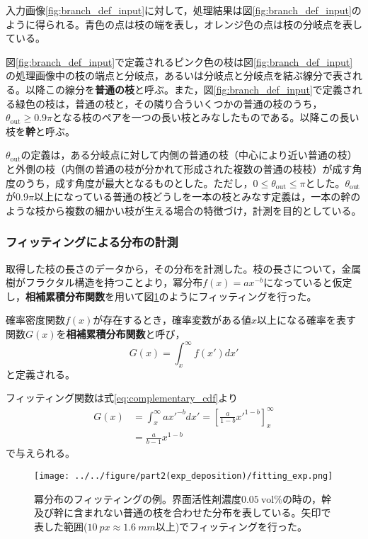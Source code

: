 \documentclass[autodetect-engine,dvi=dvipdfmx,a4paper,ja=standard,oneside,openany,11pt]{bxjsbook}
\begin{document}
入力画像\ref{fig:branch_def_input}に対して，処理結果は図\ref{fig:branch_def_input}のように得られる。青色の点は枝の端を表し，オレンジ色の点は枝の分岐点を表している。

図\ref{fig:branch_def_input}で定義されるピンク色の枝は図\ref{fig:branch_def_input}の処理画像中の枝の端点と分岐点，あるいは分岐点と分岐点を結ぶ線分で表される。以降この線分を\textbf{普通の枝}と呼ぶ。また，図\ref{fig:branch_def_input}で定義される緑色の枝は，普通の枝と，その隣り合ういくつかの普通の枝のうち，$\theta_{\mathrm{out}}\geq 0.9\pi$となる枝のペアを一つの長い枝とみなしたものである。以降この長い枝を\textbf{幹}と呼ぶ。

$\theta_{\mathrm{out}}$の定義は，ある分岐点に対して内側の普通の枝（中心により近い普通の枝）と外側の枝（内側の普通の枝が分かれて形成された複数の普通の枝枝）が成す角度のうち，成す角度が最大となるものとした。ただし，$0\leq\theta_{\mathrm{out}}\leq\pi$とした。$\theta_{\mathrm{out}}$が$0.9\pi$以上になっている普通の枝どうしを一本の枝とみなす定義は，一本の幹のような枝から複数の細かい枝が生える場合の特徴づけ，計測を目的としている。

\subsubsection{フィッティングによる分布の計測}
取得した枝の長さのデータから，その分布を計測した。枝の長さについて，金属樹がフラクタル構造を持つことより，冪分布$f(x)=ax^{-b}$になっていると仮定し，\textbf{相補累積分布関数}を用いて図\ref{fig:fitting_exp}のようにフィッティングを行った。

確率密度関数$f(x)$が存在するとき，確率変数がある値$x$以上になる確率を表す関数$G(x)$を\textbf{相補累積分布関数}と呼び，
\begin{equation}
  G(x) = \int_{x}^{\infty} f(x')dx'
  \label{eq:complementary_cdf}
\end{equation}
と定義される。

フィッティング関数は式\eqref{eq:complementary_cdf}より
\begin{equation}
  \begin{split}
    G(x) & = \int_{x}^{\infty} ax'^{-b}dx' = \left[ \frac{a}{1-b}x'^{1-b} \right]_{x}^{\infty} \\
         & = \frac{a}{b-1}x^{1-b}
  \end{split}
\end{equation}
で与えられる。
\begin{figure}[htbp]
  \centering
  \texttt{[image: ../../figure/part2(exp\_deposition)/fitting\_exp.png]}
  \caption{冪分布のフィッティングの例。界面活性剤濃度$\SI{0.05}{\mathrm{vol}\%}$の時の，幹及び幹に含まれない普通の枝を合わせた分布を表している。矢印で表した範囲($\SI{10}{px}\approx\SI{1.6}{mm}$以上)でフィッティングを行った。}
  \label{fig:fitting_exp}
\end{figure}
\end{document}

